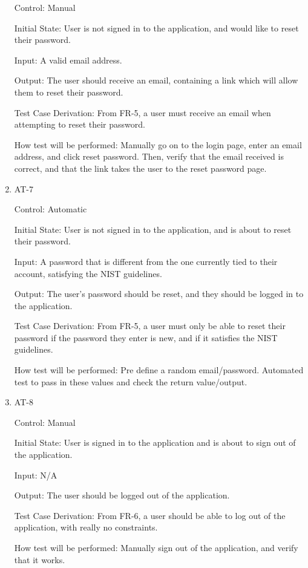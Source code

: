 \documentclass[12pt, titlepage]{article}
\begin{document}
\begin{enumerate}
Control: Manual
					
Initial State: User is not signed in to the application, and would like to reset their password.
					
Input: A valid email address.
					
Output: The user should receive an email, containing a link which will allow them to reset their password.

Test Case Derivation: From FR-5, a user must receive an email when attempting to reset their password.

How test will be performed: Manually go on to the login page, enter an email address, and click reset password. Then, verify
that the email received is correct, and that the link takes the user to the reset password page.


\item{AT-7\\}

Control: Automatic
					
Initial State: User is not signed in to the application, and is about to reset their password.
					
Input: A password that is different from the one currently tied to their account, satisfying the NIST guidelines.
					
Output: The user's password should be reset, and they should be logged in to the application.

Test Case Derivation: From FR-5, a user must only be able to reset their password if the password they enter is new, and if it 
satisfies the NIST guidelines.

How test will be performed: Pre define a random email/password. Automated test to pass in these values and check the return value/output.

\item{AT-8\\}

Control: Manual
					
Initial State: User is signed in to the application and is about to sign out of the application.
					
Input: N/A
					
Output: The user should be logged out of the application.

Test Case Derivation: From FR-6, a user should be able to log out of the application, with really no constraints.

How test will be performed: Manually sign out of the application, and verify that it works.



\end{enumerate}
\end{document}
